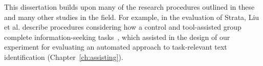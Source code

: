 This dissertation builds upon many of the research procedures outlined 
in these and many other studies in the field. 
For example, in the evaluation of Strata, 
 Liu et al. describe procedures 
considering how a control and tool-assisted group 
complete information-seeking tasks~\cite{liu2021},
which assisted in the design of our experiment for 
evaluating an automated approach to
task-relevant text identification (Chapter~\ref{ch:assisting}).
